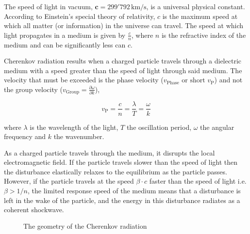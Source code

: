 \documentclass[11pt]{scrreprt}
\begin{document}
The speed of light in vacuum, \( \mathbf{c} = 299'792\,\text{km/s} \), is a universal physical constant. According to Einstein's special theory of relativity, 
\( c \) is the maximum speed at which all matter (or information) in the universe can travel. The speed at which light propagates in a 
medium is given by $\frac{c}{n}$, where $n$ is the refractive index of the medium and can be significantly less can \( c \).

Cherenkov radiation results when a charged particle travels through a dielectric medium with a speed greater than the speed of light 
through said medium. The velocity that must be exceeded is the phase velocity (\( v_{\text{Phase}} \text{ or short } v_{\text{P}} \)) 
and not the group velocity (\( v_{\text{Group}} = \frac{\partial \omega}{\partial k} \)),

\[ v_{\text{P}} = \frac{c}{n} = \frac{\lambda}{T}  =  \frac{\omega}{k}\]

where $\lambda$ is the wavelength of the light, $T$ the oscillation period, $\omega$ the angular frequency and $k$ the wavenumber.

As a charged particle travels through the medium, it disrupts the local electromagnetic field. If the particle travels slower than
the speed of light then the disturbance elastically relaxes to the equilibrium as the particle passes. However, if the particle 
travels at the speed $\beta\cdot c$ faster than the speed of light i.e. $\beta > 1/n$, the limited response speed of the medium means that a disturbance is left in the wake of the 
particle, and the energy in this disturbance radiates as a coherent shockwave.

\begin{figure}[htbp]
  \centering
  \caption{The geometry of the Cherenkov radiation}
  \label{fig:cherenkov_radiation}
\end{figure}
\end{document}
